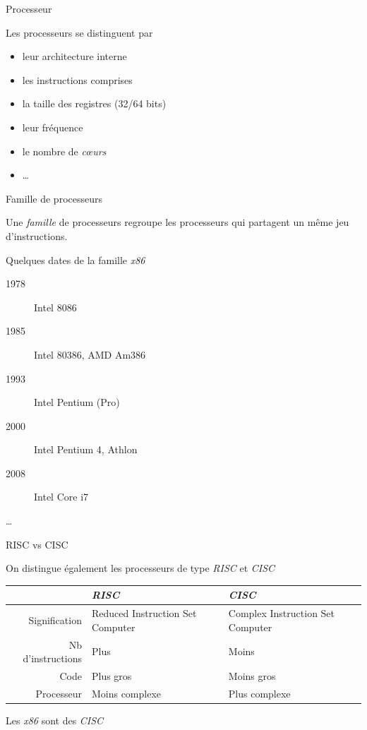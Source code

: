 \documentclass[14pt,xcolor,table]{beamer}
\begin{document}
\begin{frame}[fragile]{Processeur}
	
	Les processeurs se distinguent par
	
	\begin{itemize}
	\item leur architecture interne
	\item les instructions comprises
	\item la taille des registres (32/64 bits)
	\item leur fréquence
	\item le nombre de \textit{c\oe{}urs}
	\item \dots
	\end{itemize}
	
\end{frame}

\begin{frame}[fragile]{Famille de processeurs}
	
	Une \emph{famille} de processeurs regroupe
	les processeurs qui partagent un même jeu
	d'instructions.

	\bigskip
	Quelques dates de la famille \emph{x86}
	\begin{description}
	\item[1978] Intel 8086
	\item[1985] Intel 80386, AMD Am386
	\item[1993] Intel Pentium (Pro)
	\item[2000] Intel Pentium 4, Athlon
	\item[2008] Intel Core i7
	\item[\dots]
	\end{description}
	
\end{frame}

\begin{frame}[fragile]{RISC vs CISC}

On distingue également les processeurs de type \emph{RISC} et \emph{CISC}

\bigskip
\begin{footnotesize}
\begin{tabular}{rp{3cm}p{3cm}}
	& \emph{RISC} & \emph{CISC} \\\hline
Signification & Reduced Instruction Set Computer & Complex Instruction Set Computer \\\hline
Nb d'instructions & Plus & Moins \\\hline
Code & Plus gros & Moins gros \\\hline
Processeur & Moins complexe & Plus complexe \\\hline
\end{tabular}
\end{footnotesize}

\bigskip
Les \emph{x86} sont des \emph{CISC}

\end{frame}
\end{document}
